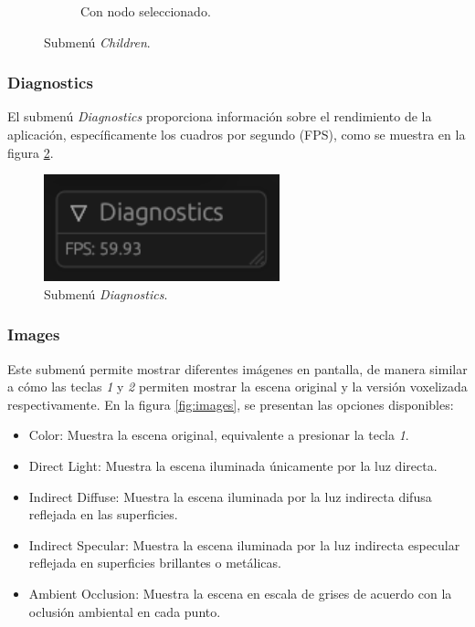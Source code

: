 \begin{figure}[h]
\begin{center}
\begin{subfigure}{.49\textwidth}
        \caption{Con nodo seleccionado.}
    \end{subfigure}
    \caption{Submenú \textit{Children}.}
    \label{fig:children}
    \end{center}
\end{figure}

\subsubsection{Diagnostics}

El submenú \textit{Diagnostics} proporciona información sobre el rendimiento de la aplicación, específicamente los cuadros por segundo (FPS), como se muestra en la figura \ref{fig:diagnostics}.

\begin{figure}[h]
    \centering
    \includegraphics[width=.5\textwidth]{diagnostics.png}
    \caption{Submenú \textit{Diagnostics}.}
    \label{fig:diagnostics}
\end{figure}

\subsubsection{Images}

Este submenú permite mostrar diferentes imágenes en pantalla, de manera similar a cómo las teclas \textit{1} y \textit{2} permiten mostrar la escena original y la versión voxelizada respectivamente. En la figura \ref{fig:images}, se presentan las opciones disponibles:

\begin{itemize}
    \item Color: Muestra la escena original, equivalente a presionar la tecla \textit{1}.
    \item Direct Light: Muestra la escena iluminada únicamente por la luz directa.
    \item Indirect Diffuse: Muestra la escena iluminada por la luz indirecta difusa reflejada en las superficies.
    \item Indirect Specular: Muestra la escena iluminada por la luz indirecta especular reflejada en superficies brillantes o metálicas.
    \item Ambient Occlusion: Muestra la escena en escala de grises de acuerdo con la oclusión ambiental en cada punto.
\end{itemize}

